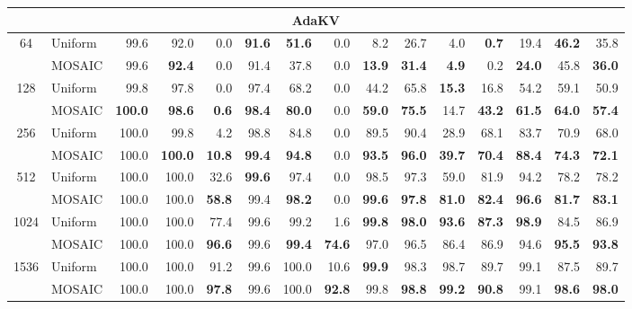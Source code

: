 \begin{table}[tp]
\begin{tabular}{@{} c l rrrrrrrrrrrrr @{}}
    \midrule
    \multicolumn{15}{c}{\textbf{AdaKV}} \\
    \midrule
    \multirow{2}{*}{64} & Uniform & 99.6 & 92.0 & 0.0 & \textbf{91.6} & \textbf{51.6} & 0.0 & 8.2 & 26.7 & 4.0 & \textbf{0.7} & 19.4 & \textbf{46.2} & 35.8 \\
     & MOSAIC & 99.6 & \textbf{92.4} & 0.0 & 91.4 & 37.8 & 0.0 & \textbf{13.9} & \textbf{31.4} & \textbf{4.9} & 0.2 & \textbf{24.0} & 45.8 & \textbf{36.0} \\
    \cmidrule(l){1-15}
    \multirow{2}{*}{128} & Uniform & 99.8 & 97.8 & 0.0 & 97.4 & 68.2 & 0.0 & 44.2 & 65.8 & \textbf{15.3} & 16.8 & 54.2 & 59.1 & 50.9 \\
     & MOSAIC & \textbf{100.0} & \textbf{98.6} & \textbf{0.6} & \textbf{98.4} & \textbf{80.0} & 0.0 & \textbf{59.0} & \textbf{75.5} & 14.7 & \textbf{43.2} & \textbf{61.5} & \textbf{64.0} & \textbf{57.4} \\
    \cmidrule(l){1-15}
    \multirow{2}{*}{256} & Uniform & 100.0 & 99.8 & 4.2 & 98.8 & 84.8 & 0.0 & 89.5 & 90.4 & 28.9 & 68.1 & 83.7 & 70.9 & 68.0 \\
     & MOSAIC & 100.0 & \textbf{100.0} & \textbf{10.8} & \textbf{99.4} & \textbf{94.8} & 0.0 & \textbf{93.5} & \textbf{96.0} & \textbf{39.7} & \textbf{70.4} & \textbf{88.4} & \textbf{74.3} & \textbf{72.1} \\
    \cmidrule(l){1-15}
    \multirow{2}{*}{512} & Uniform & 100.0 & 100.0 & 32.6 & \textbf{99.6} & 97.4 & 0.0 & 98.5 & 97.3 & 59.0 & 81.9 & 94.2 & 78.2 & 78.2 \\
     & MOSAIC & 100.0 & 100.0 & \textbf{58.8} & 99.4 & \textbf{98.2} & 0.0 & \textbf{99.6} & \textbf{97.8} & \textbf{81.0} & \textbf{82.4} & \textbf{96.6} & \textbf{81.7} & \textbf{83.1} \\
    \cmidrule(l){1-15}
    \multirow{2}{*}{1024} & Uniform & 100.0 & 100.0 & 77.4 & 99.6 & 99.2 & 1.6 & \textbf{99.8} & \textbf{98.0} & \textbf{93.6} & \textbf{87.3} & \textbf{98.9} & 84.5 & 86.9 \\
     & MOSAIC & 100.0 & 100.0 & \textbf{96.6} & 99.6 & \textbf{99.4} & \textbf{74.6} & 97.0 & 96.5 & 86.4 & 86.9 & 94.6 & \textbf{95.5} & \textbf{93.8} \\
    \cmidrule(l){1-15}
    \multirow{2}{*}{1536} & Uniform & 100.0 & 100.0 & 91.2 & 99.6 & 100.0 & 10.6 & \textbf{99.9} & 98.3 & 98.7 & 89.7 & 99.1 & 87.5 & 89.7 \\
     & MOSAIC & 100.0 & 100.0 & \textbf{97.8} & 99.6 & 100.0 & \textbf{92.8} & 99.8 & \textbf{98.8} & \textbf{99.2} & \textbf{90.8} & 99.1 & \textbf{98.6} & \textbf{98.0} \\

\end{tabular}
\end{table}
